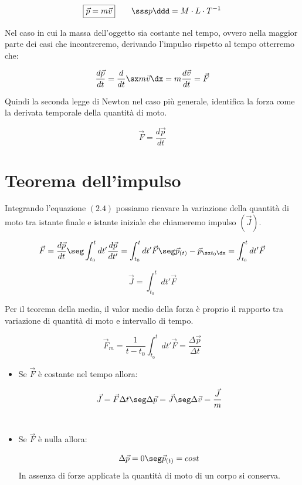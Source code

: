 \begin{equation}
\boxed{\vec p = m\vec v}\quad\quad \sss p\ddd = M\cdot L\cdot T^{-1}
\end{equation}

Nel caso in cui la massa dell'oggetto sia costante nel tempo, ovvero nella maggior parte dei casi che incontreremo, derivando l'impulso rispetto al tempo otterremo che:

\begin{equation}
\frac{d\vec p}{dt} = \frac d{dt}\sx m\vec v\dx = m\frac{d\vec v}{dt} = \vec F
\end{equation}

Quindi la seconda legge di Newton nel caso più generale, identifica la forza come la derivata temporale della quantità di moto.

\begin{equation}
\boxed{\vec F = \frac{d\vec p}{dt}}
\end{equation}




\section{Teorema dell'impulso}
Integrando l'equazione $(2.4)$ possiamo ricavare la variazione della quantità di moto tra istante finale e istante iniziale che chiameremo impulso $(\vec J)$.




\begin{equation}
\vec F = \frac{d\vec p}{dt}\seg \int_{t_0}^tdt'\frac{d\vec p}{dt'} = \int_{t_0}^tdt'\vec F\seg \vec p_{(t)} - \vec p_{\sx t_0\dx} = \int_{t_0}^tdt'\vec F
\end{equation}

\begin{equation}
\boxed{\vec J = \int_{t_0}^tdt'\vec F}
\end{equation}

Per il teorema della media, il valor medio della forza  è proprio il rapporto tra variazione di quantità di moto e intervallo di tempo.

\begin{equation}
\vec F_m = \frac1{t-t_0}\int_{t_0}^tdt'\vec F = \frac{\Delta\vec p}{\Delta t}
\end{equation}

\begin{itemize}
\item Se $\vec F$ è costante nel tempo allora:

\begin{equation}
\vec J = \vec F\Delta t\seg \Delta \vec p = \vec J \seg \Delta \vec v =\frac{\vec J}m
\end{equation}
\\
\item Se $\vec F$ è nulla allora:

\begin{equation}
\Delta\vec p = 0 \seg \vec p_{(t)} = cost
\end{equation}
In assenza di forze applicate la quantità di moto di un corpo si conserva.
\end{itemize}





